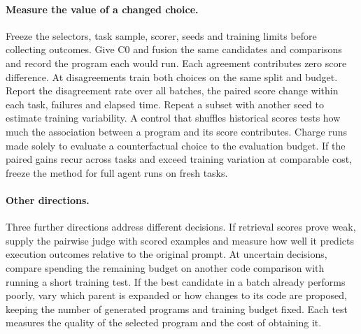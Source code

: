 \documentclass{article}
\begin{document}
\paragraph{Measure the value of a changed choice.}
Freeze the selectors, task sample, scorer, seeds and training limits before collecting outcomes. Give C0 and fusion the same candidates and comparisons and record the program each would run. Each agreement contributes zero score difference. At disagreements train both choices on the same split and budget. Report the disagreement rate over all batches, the paired score change within each task, failures and elapsed time. Repeat a subset with another seed to estimate training variability. A control that shuffles historical scores tests how much the association between a program and its score contributes. Charge runs made solely to evaluate a counterfactual choice to the evaluation budget. If the paired gains recur across tasks and exceed training variation at comparable cost, freeze the method for full agent runs on fresh tasks.

\paragraph{Other directions.}
Three further directions address different decisions. If retrieval scores prove weak, supply the pairwise judge with scored examples and measure how well it predicts execution outcomes relative to the original prompt. At uncertain decisions, compare spending the remaining budget on another code comparison with running a short training test. If the best candidate in a batch already performs poorly, vary which parent is expanded or how changes to its code are proposed, keeping the number of generated programs and training budget fixed. Each test measures the quality of the selected program and the cost of obtaining it.
\end{document}
